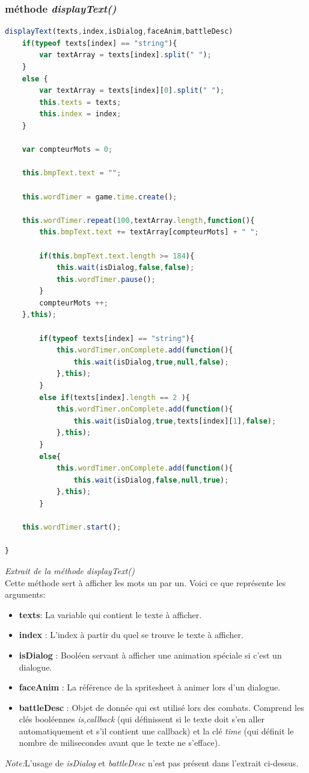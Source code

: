 \documentclass[11pt]{article}
\begin{document}
\begin{appendices}
\subsubsection{méthode \textit{displayText()}}
\begin{lstlisting}[language=JavaScript]
displayText(texts,index,isDialog,faceAnim,battleDesc)
    if(typeof texts[index] == "string"){
        var textArray = texts[index].split(" "); 
    }
    else {
        var textArray = texts[index][0].split(" ");
        this.texts = texts;
        this.index = index;
    }

    var compteurMots = 0;

    this.bmpText.text = "";

    this.wordTimer = game.time.create();

    this.wordTimer.repeat(100,textArray.length,function(){
        this.bmpText.text += textArray[compteurMots] + " ";

        if(this.bmpText.text.length >= 184){
            this.wait(isDialog,false,false);
            this.wordTimer.pause();
        }
        compteurMots ++;
    },this);
  
        if(typeof texts[index] == "string"){
            this.wordTimer.onComplete.add(function(){
                this.wait(isDialog,true,null,false);
            },this); 
        }
        else if(texts[index].length == 2 ){
            this.wordTimer.onComplete.add(function(){
                this.wait(isDialog,true,texts[index][1],false);
            },this);
        }
        else{
            this.wordTimer.onComplete.add(function(){
                this.wait(isDialog,false,null,true);
            },this);
        }
    
    this.wordTimer.start();

}
\end{lstlisting} 
\textit{Extrait de la méthode displayText()}\\
Cette méthode sert à afficher les mots un par un. Voici ce que représente les arguments:\\
\begin{itemize}
\item \textbf{texts}: La variable qui contient le texte à afficher.
\item \textbf{index} : L'index à partir du quel se trouve le texte à afficher.
\item \textbf{isDialog} : Booléen servant à afficher une animation spéciale si c'est un dialogue.
\item \textbf{faceAnim} : La référence de la spritesheet à animer lors d'un dialogue.
\item \textbf{battleDesc} : Objet de donnée qui est utilisé lors des combats. Comprend les clés booléennes \textit{is,callback} (qui définissent si le texte doit s'en aller automatiquement et s'il contient une callback) et la clé \textit{time} (qui définit le nombre de milisecondes avant que le texte ne s'efface).
\end{itemize}
\textit{Note:}L'usage de \textit{isDialog} et \textit{battleDesc} n'est pas présent dans l'extrait ci-dessus.\\


\end{appendices}
\end{document}
